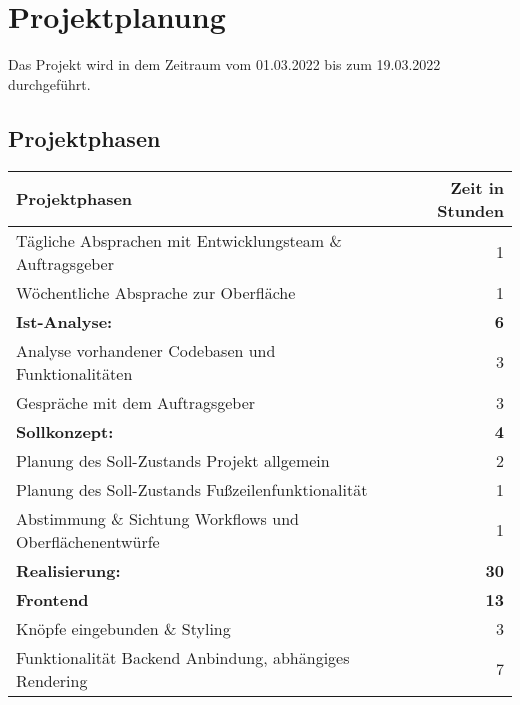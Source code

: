 \section{Projektplanung}
\label{projektplanung}
Das Projekt wird in dem Zeitraum vom 01.03.2022 bis zum 19.03.2022 durchgeführt. %

\subsection{Projektphasen}
\label{projektphasen}

{
\begin{tabular}{|l|r|}
	\hline
	\textbf{Projektphasen }                                   & \textbf{Zeit in Stunden} \\ \hline
	Tägliche Absprachen mit Entwicklungsteam \& Auftragsgeber &                        1 \\
	Wöchentliche Absprache zur Oberfläche                     &                        1 \\
	\textbf{Ist-Analyse: }                                    &               \textbf{6} \\
	Analyse vorhandener Codebasen und Funktionalitäten        &                        3 \\
	Gespräche mit dem Auftragsgeber                           &                        3 \\
	\textbf{Sollkonzept:  }                                   &               \textbf{4} \\
	Planung des Soll-Zustands Projekt allgemein               &                        2 \\
	Planung des Soll-Zustands Fußzeilenfunktionalität         &                        1 \\
	Abstimmung \& Sichtung Workflows und Oberflächenentwürfe  &                        1 \\
	\textbf{Realisierung: }                                   &              \textbf{30} \\
	\textbf{Frontend  }                                       &              \textbf{13} \\
	Knöpfe eingebunden \& Styling                             &                        3 \\
	Funktionalität Backend Anbindung, abhängiges Rendering    &                        7 \\

\end{tabular}}

